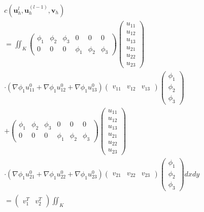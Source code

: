 \documentclass{ctexart}
\begin{document}
\begin{align*}
    & c(\mathbf{u}_h^{l}, \mathbf{u}_h^{(l-1)}, \mathbf{v}_h)\\
    & = \iint_K
\begin{pmatrix}
    \phi_1&  \phi_2& \phi_3 & 0 & 0 & 0\\
    0 & 0 & 0 & \phi_1 & \phi_2 & \phi_3
  \end{pmatrix} 
  \begin{pmatrix}
   u_{11}\\
   u_{12}\\
   u_{13}\\
   u_{21}\\
   u_{22}\\
   u_{23}
  \end{pmatrix} \\
  & \cdot
(\nabla \phi_1 u_{11}^0 + \nabla \phi_1 u_{12}^0 + \nabla \phi_1 u_{13}^0 )\begin{pmatrix}
  v_{11}& v_{12} & v_{13}
\end{pmatrix}
\begin{pmatrix}
 \phi_1\\
 \phi_2\\
 \phi_3
\end{pmatrix}\\
& +
\begin{pmatrix}
    \phi_1&  \phi_2& \phi_3 & 0 & 0 & 0\\
    0 & 0 & 0 & \phi_1 & \phi_2 & \phi_3
  \end{pmatrix} 
  \begin{pmatrix}
   u_{11}\\
   u_{12}\\
   u_{13}\\
   u_{21}\\
   u_{22}\\
   u_{23}
  \end{pmatrix} \\
  & \cdot
(\nabla \phi_1 u_{21}^0 + \nabla \phi_1 u_{22}^0 + \nabla \phi_1 u_{23}^0 )\begin{pmatrix}
  v_{21}& v_{22} & v_{23}
\end{pmatrix}
\begin{pmatrix}
 \phi_1\\
 \phi_2\\
 \phi_3
\end{pmatrix}dxdy\\
&=\begin{pmatrix}
  v_1^T&v_2^T
\end{pmatrix}
\iint_K \\

\end{align*}
\end{document}
